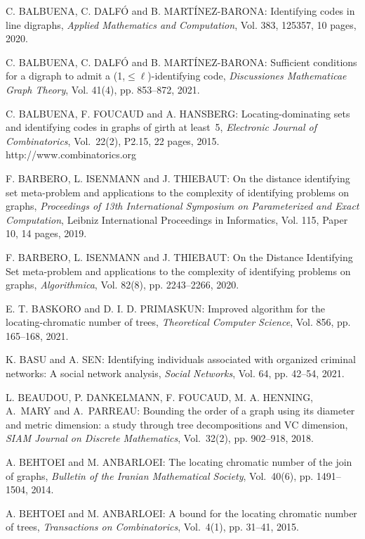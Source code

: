\begin{thebibliography}{999}
C. BALBUENA, C. DALF\'O and B. MART\'INEZ-BARONA: Identifying codes in line digraphs, {\it Applied Mathematics and Computation}, Vol. 383, 125357, 10 pages, 2020.

C. BALBUENA, C. DALF\'O and B. MART\'INEZ-BARONA: Sufficient conditions for a digraph to admit a (1,$\leq \ell$)-identifying code, {\it Discussiones Mathematicae Graph Theory}, Vol. 41(4), pp. 853--872, 2021.

C. BALBUENA, F. FOUCAUD and A. HANSBERG: Locating-dominating sets and identifying codes in graphs of girth at least~5, {\it Electronic Journal of Combinatorics}, Vol.~22(2), P2.15, 22 pages, 2015.\\
http://www.combinatorics.org

F. BARBERO, L. ISENMANN and J. THIEBAUT: On the distance identifying set meta-problem and applications to the complexity of identifying problems on graphs, {\it Proceedings of 13th International Symposium on Parameterized and Exact Computation}, Leibniz International Proceedings in Informatics, Vol. 115, Paper 10, 14 pages, 2019.

F. BARBERO, L. ISENMANN and J. THIEBAUT: On the Distance Identifying Set meta-problem and applications to the complexity of identifying problems on graphs, {\it Algorithmica}, Vol. 82(8), pp. 2243--2266, 2020.

E. T. BASKORO and D. I. D. PRIMASKUN: Improved algorithm for the locating-chromatic number of trees, {\it Theoretical Computer Science}, Vol. 856, pp. 165--168, 2021.

K. BASU and A. SEN: Identifying individuals associated with organized criminal networks: A social network analysis, {\it Social Networks}, Vol. 64, pp. 42--54, 2021.

L. BEAUDOU, P. DANKELMANN, F. FOUCAUD, M. A. HENNING, A.~MARY and A.~PARREAU: Bounding the order of a graph using its diameter and metric dimension: a study through tree decompositions and VC dimension, {\it SIAM Journal on Discrete Mathematics}, Vol.~32(2), pp. 902--918, 2018.

A. BEHTOEI and M. ANBARLOEI: The locating chromatic number of the join of graphs, {\it Bulletin of the Iranian Mathematical Society}, Vol.~40(6), pp. 1491--1504, 2014.

A. BEHTOEI and M. ANBARLOEI: A bound for the locating chromatic number of trees, {\it Transactions on Combinatorics}, Vol.~4(1), pp. 31--41, 2015.


\end{thebibliography}
